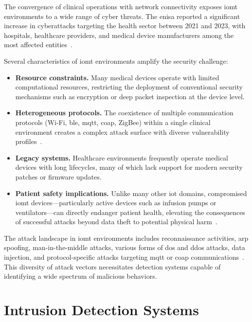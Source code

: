 The convergence of clinical operations with network connectivity exposes \gls{iomt} environments to a wide range of cyber threats. The \gls{enisa} reported a significant increase in cyberattacks targeting the health sector between 2021 and 2023, with hospitals, healthcare providers, and medical device manufacturers among the most affected entities~\cite{enisa2023health}.

Several characteristics of \gls{iomt} environments amplify the security challenge:

\begin{itemize}
    \item \textbf{Resource constraints.} Many medical devices operate with limited computational resources, restricting the deployment of conventional security mechanisms such as encryption or deep packet inspection at the device level.

    \item \textbf{Heterogeneous protocols.} The coexistence of multiple communication protocols (Wi-Fi, \gls{ble}, \gls{mqtt}, \gls{coap}, ZigBee) within a single clinical environment creates a complex attack surface with diverse vulnerability profiles~\cite{dadkhah2024ciciomt}.

    \item \textbf{Legacy systems.} Healthcare environments frequently operate medical devices with long lifecycles, many of which lack support for modern security patches or firmware updates.

    \item \textbf{Patient safety implications.} Unlike many other \gls{iot} domains, compromised \gls{iomt} devices---particularly active devices such as infusion pumps or ventilators---can directly endanger patient health, elevating the consequences of successful attacks beyond data theft to potential physical harm~\cite{domenech2024ensuring}.
\end{itemize}

The attack landscape in \gls{iomt} environments includes reconnaissance activities, \gls{arp} spoofing, man-in-the-middle attacks, various forms of \gls{dos} and \gls{ddos} attacks, data injection, and protocol-specific attacks targeting \gls{mqtt} or \gls{coap} communications~\cite{leon2025miotta}. This diversity of attack vectors necessitates detection systems capable of identifying a wide spectrum of malicious behaviors.

\section{Intrusion Detection Systems}
\label{sec:ids}

